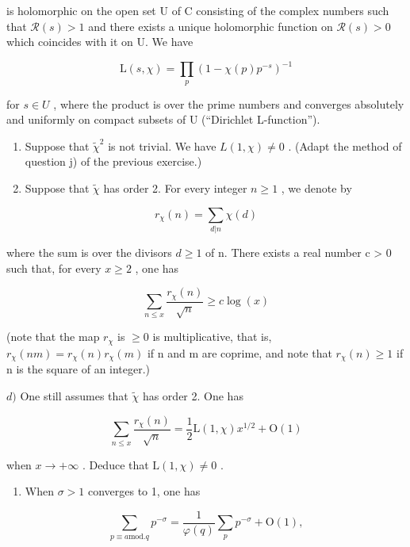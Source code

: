 is holomorphic on the open set U of C consisting of the complex numbers such that \(\mathcal{R}(s) > 1\) and there exists a unique holomorphic function on \(\mathcal{R}(s) > 0\) which coincides with it on U. We have

\[
\mathrm{L} (s, \chi) = \prod_ {p} (1 - \chi (p) p ^ {- s}) ^ {- 1}
\]

for \(s \in U\) , where the product is over the prime numbers and converges absolutely and uniformly on compact subsets of U (“Dirichlet L-function”).

\begin{enumerate}
\def\labelenumi{\alph{enumi})}
\setcounter{enumi}{1}
\item
  Suppose that \(\widetilde{\chi}^{2}\) is not trivial. We have \(L(1,\chi)\neq0\) . (Adapt the method of question j) of the previous exercise.)
\item
  Suppose that \(\widetilde{\chi}\) has order 2. For every integer \(n \geqslant 1\) , we denote by
\end{enumerate}

\[
r _ {\chi} (n) = \sum_ {d | n} \chi (d)
\]

where the sum is over the divisors \(d \geqslant 1\) of n. There exists a real number c \textgreater{} 0 such that, for every \(x \geqslant 2\) , one has

\[
\sum_ {n \leqslant x} \frac {r _ {\chi} (n)}{\sqrt {n}} \geqslant c \log (x)
\]

(note that the map \(r_{\chi}\) is \(\geqslant 0\) is multiplicative, that is, \(r_{\chi}(nm) = r_{\chi}(n)r_{\chi}(m)\) if n and m are coprime, and note that \(r_{\chi}(n) \geqslant 1\) if n is the square of an integer.)

\(d)\) One still assumes that \(\widetilde{\chi}\) has order 2. One has

\[
\sum_ {n \leqslant x} \frac {r _ {\chi} (n)}{\sqrt {n}} = \frac {1}{2} \mathrm{L} (1, \chi) x ^ {1 / 2} + \mathrm{O} (1)
\]

when \(x \to +\infty\) . Deduce that \(\mathrm{L}(1, \chi) \neq 0\) .

\begin{enumerate}
\def\labelenumi{\alph{enumi})}
\setcounter{enumi}{4}
\tightlist
\item
  When \(\sigma > 1\) converges to 1, one has
\end{enumerate}

\[
\sum_ {p \equiv a \text {mod.} q} p ^ {- \sigma} = \frac {1}{\varphi (q)} \sum_ {p} p ^ {- \sigma} + \mathrm{O} (1),
\]

